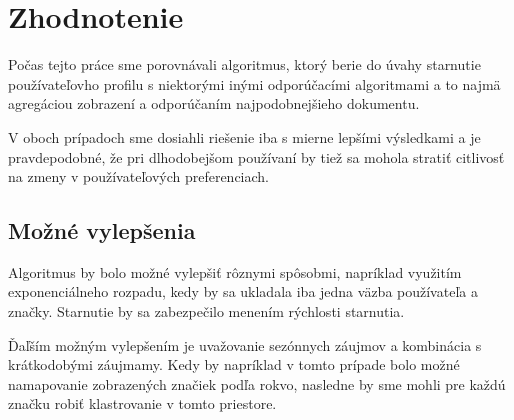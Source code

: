 ﻿\newpage

\section{Zhodnotenie}

Počas tejto práce sme porovnávali algoritmus, ktorý berie do úvahy starnutie 
používateľovho profilu s niektorými inými odporúčacími algoritmami a to najmä 
agregáciou zobrazení a odporúčaním najpodobnejšieho dokumentu.

V oboch prípadoch sme dosiahli riešenie iba s mierne lepšími výsledkami a je pravdepodobné,
že pri dlhodobejšom používaní by tiež sa mohola stratiť citlivosť na zmeny v používateľových
preferenciach. 

\subsection{Možné vylepšenia}

Algoritmus by bolo možné vylepšiť rôznymi spôsobmi, napríklad využitím
exponenciálneho rozpadu, kedy by sa ukladala iba jedna väzba používateľa a 
značky. Starnutie by sa zabezpečilo menením rýchlosti starnutia.

Ďaľším možným vylepšením je uvažovanie sezónnych záujmov a kombinácia s krátkodobými 
záujmamy. Kedy by napríklad v tomto prípade bolo možné namapovanie zobrazených značiek 
podľa rokvo, nasledne by sme mohli pre každú značku robiť klastrovanie v tomto priestore.
